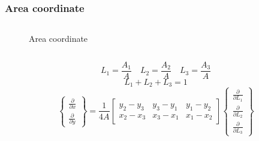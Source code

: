 \documentclass[9pt]{beamer}
\begin{document}
\begin{frame}\frametitle{Area coordinate}

\begin{columns}

\begin{figure}[h!]
\centering


\caption{Area coordinate} 
\label{fig:areacord}
\end{figure}

\end{columns}

\begin{equation*}
L_1 = \frac{A_1}{A} \quad L_2 = \frac{A_2}{A} \quad L_3 = \frac{A_3}{A}
\end{equation*}
\begin{equation*}
L_1 + L_2 + L_3 = 1
\end{equation*}
\begin{equation*}
\left\{
\begin{array}{r}
 \frac{\partial}{\partial x}\\
\frac{\partial}{\partial y}
\end{array} \right\}
=
\frac{1}{4 A}
\begin{bmatrix}
y_2-y_3 & y_3-y_1 & y_1-y_2 \\
x_2-x_3 & x_3-x_1 & x_1-x_2
\end{bmatrix} 
\left\{
\begin{array}{r}
 \frac{\partial}{\partial L_1}\\
 \frac{\partial}{\partial L_2}\\
 \frac{\partial}{\partial L_3}
\end{array} \right\}
\end{equation*}
\end{frame}
\end{document}
